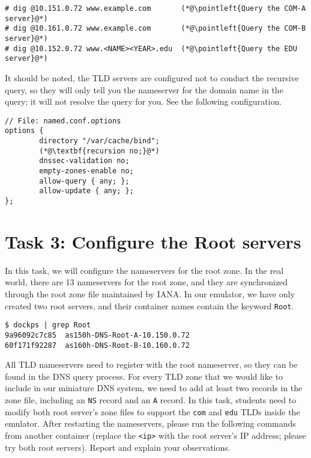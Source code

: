 \begin{lstlisting}
# dig @10.151.0.72 www.example.com       (*@\pointleft{Query the COM-A server}@*) 
# dig @10.161.0.72 www.example.com       (*@\pointleft{Query the COM-B server}@*) 
# dig @10.152.0.72 www.<NAME><YEAR>.edu  (*@\pointleft{Query the EDU server}@*) 
\end{lstlisting}



It should be noted, the TLD servers are configured
not to conduct the recursive query, so they will only tell you
the nameserver for the domain name in the query; it will not
resolve the query for you.  See the following configuration.

\begin{lstlisting}
// File: named.conf.options
options {
        directory "/var/cache/bind";
        (*@\textbf{recursion no;}@*)  
        dnssec-validation no;
        empty-zones-enable no;
        allow-query { any; };
        allow-update { any; };
};
\end{lstlisting}
 


\section{Task 3: Configure the Root servers}

In this task, we will configure the nameservers for the root zone. 
In the real world, there are 13 nameservers for the root zone,
and they are synchronized through the root zone file maintained by IANA. 
In our emulator, we have only created two root servers, 
and their container names contain the keyword \texttt{Root}. 

\begin{lstlisting}
$ dockps | grep Root
9a96092c7c85  as150h-DNS-Root-A-10.150.0.72
60f171f92287  as160h-DNS-Root-B-10.160.0.72
\end{lstlisting}
 

All TLD nameservers need to register
with the root nameserver, so they can be found
in the DNS query process.
For every TLD zone that we would like to include in our
miniature DNS system, we need to add at least two records
in the zone file, including an \texttt{NS} record
and an \texttt{A} record.  In this task, students need to
modify both root server's zone files to support the 
\texttt{com} and \texttt{edu} TLDs inside the emulator. 
After restarting the nameservers, please run the 
following commands from another container (replace
the \texttt{<ip>} with the root server's IP address;
please try both root servers). 
Report and explain your observations. 

